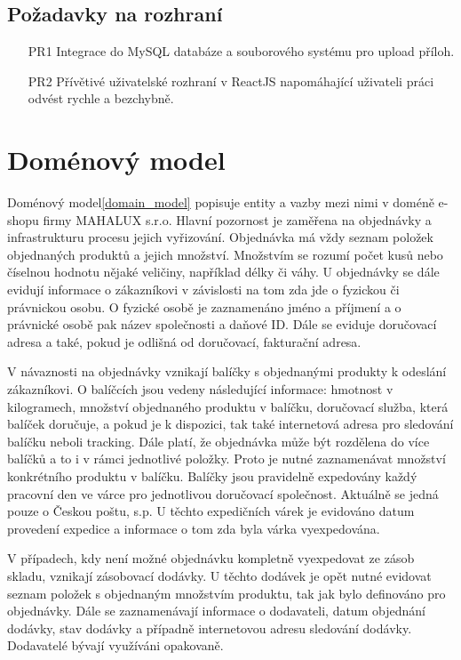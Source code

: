 \documentclass[thesis=B,czech]{FITthesis}[2012/06/26]
\begin{document}
\subsection{Požadavky na rozhraní}
\begin{enumerate}
	\item[PR1] Integrace do MySQL databáze a souborového systému pro upload příloh.
	\item[PR2] Přívětivé uživatelské rozhraní v ReactJS napomáhající uživateli práci odvést rychle a bezchybně.
\end{enumerate}

\section{Doménový model}
	Doménový model\ref{domain_model} popisuje entity a vazby mezi nimi v doméně e-shopu firmy MAHALUX s.r.o. Hlavní pozornost je zaměřena na objednávky a infrastrukturu procesu jejich vyřizování. Objednávka má vždy seznam položek objednaných produktů a jejich množství. Množstvím se rozumí počet kusů nebo číselnou hodnotu nějaké veličiny, například délky či váhy. U objednávky se dále evidují informace o zákazníkovi v závislosti na tom zda jde o fyzickou či právnickou osobu. O fyzické osobě je zaznamenáno jméno a příjmení a o právnické osobě pak název společnosti a daňové ID. Dále se eviduje doručovací adresa a také, pokud je odlišná od doručovací, fakturační adresa.
	
	V návaznosti na objednávky vznikají balíčky s objednanými produkty k odeslání zákazníkovi. O balíčcích jsou vedeny následující informace: hmotnost v kilogramech, množství objednaného produktu v balíčku, doručovací služba, která balíček doručuje, a pokud je k dispozici, tak také internetová adresa pro sledování balíčku neboli tracking. Dále platí, že objednávka může být rozdělena do více balíčků a to i v rámci jednotlivé položky. Proto je nutné zaznamenávat množství konkrétního produktu v balíčku. Balíčky jsou pravidelně expedovány každý pracovní den ve várce pro jednotlivou doručovací společnost. Aktuálně se jedná pouze o Českou poštu, s.p. U těchto expedičních várek je evidováno datum provedení expedice a informace o tom zda byla várka vyexpedována.
	
	V případech, kdy není možné objednávku kompletně vyexpedovat ze zásob skladu, vznikají zásobovací dodávky. U těchto dodávek je opět nutné evidovat seznam položek s objednaným množstvím produktu, tak jak bylo definováno pro objednávky. Dále se zaznamenávají informace o dodavateli, datum objednání dodávky, stav dodávky a případně internetovou adresu sledování dodávky. Dodavatelé bývají využíváni opakovaně.
	
\end{document}
